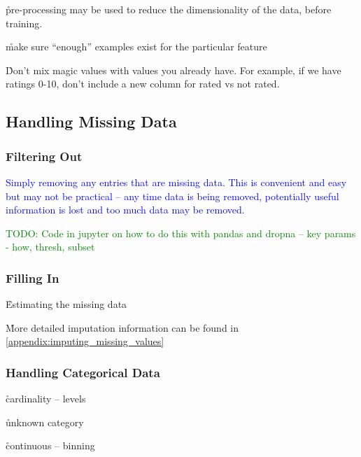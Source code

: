 
\r{pre-processing may be used to reduce the dimensionality of the data, before training.}

\r{make sure ``enough'' examples exist for the particular feature}

\r{Don't mix magic values with values you already have. For example, if we have ratings 0-10, don't include a new column for rated vs not rated.}

\subsection{Handling Missing Data}

\subsubsection{Filtering Out}

\textcolor{blue}{Simply removing any entries that are missing data. This is convenient and easy but may not be practical -- any time data is being removed, potentially useful information is lost and too much data may be removed.}

\textcolor{green}{TODO: Code in jupyter on how to do this with pandas and dropna -- key params - how, thresh, subset}

\subsubsection{Filling In}

\r{Estimating the missing data}

\r{More detailed imputation information can be found in \ref{appendix:imputing_missing_values}}

\subsubsection{Handling Categorical Data}

\r{cardinality -- levels}

\r{unknown category}

\r{continuous -- binning}



